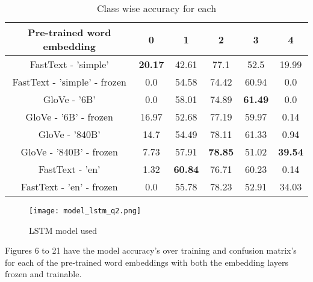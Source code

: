 \documentclass{article}
\begin{document}
\begin{table}[h!]
\begin{center}
\begin{tabular}{ |c|c|c|c|c|c|} 
 \hline
 Pre-trained word embedding & 0 & 1 & 2 & 3 & 4\\ 
 \hline \hline
 FastText - 'simple' & \textbf{20.17} & 42.61 & 77.1 & 52.5 & 19.99 \\ 
 \hline
  FastText - 'simple' - frozen & 0.0 & 54.58 & 74.42 & 60.94 & 0.0 \\
 \hline
 GloVe - '6B' & 0.0 & 58.01 & 74.89 & \textbf{61.49} & 0.0 \\
\hline
 GloVe - '6B' - frozen & 16.97 & 52.68 & 77.19 & 59.97 & 0.14 \\
 \hline
 GloVe - '840B' & 14.7 & 54.49 & 78.11 & 61.33 & 0.94 \\
\hline
 GloVe - '840B' - frozen & 7.73 & 57.91 & \textbf{78.85} & 51.02 & \textbf{39.54} \\
 \hline
 FastText - 'en' & 1.32 & \textbf{60.84} & 76.71 & 60.23 & 0.14 \\
  \hline
 FastText - 'en' - frozen & 0.0 & 55.78 & 78.23 & 52.91 & 34.03 \\  


\hline
\end{tabular}
\caption{Class wise accuracy for each }
\label{tab:classwise_results_pretrained}
\end{center}
\end{table}

\begin{figure}[H]
    \centering
    \texttt{[image: model\_lstm\_q2.png]}
    \caption{LSTM model used}
    \label{fig:best_model}
\end{figure}

\noindent
Figures 6 to 21 have the model accuracy's over training and confusion matrix's for each of the pre-trained word embeddings with both the embedding layers frozen and trainable.
\newpage
\end{document}
